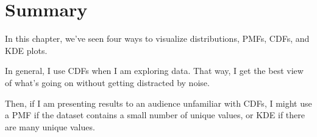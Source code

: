\hypertarget{summary}{%
\section{Summary}\label{summary}}

In this chapter, we've seen four ways to visualize distributions, PMFs,
CDFs, and KDE plots.

In general, I use CDFs when I am exploring data. That way, I get the
best view of what's going on without getting distracted by noise.

Then, if I am presenting results to an audience unfamiliar with CDFs, I
might use a PMF if the dataset contains a small number of unique values,
or KDE if there are many unique values.

